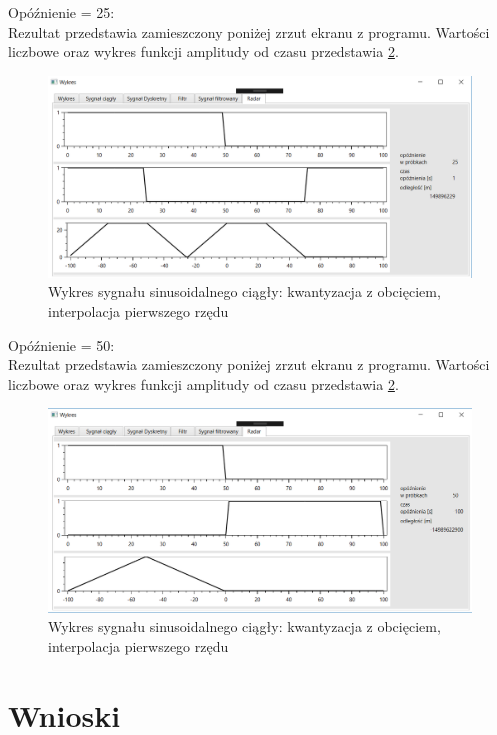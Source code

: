 \documentclass[12pt]{article}
\begin{document}
Opóźnienie = 25:
\\Rezultat przedstawia zamieszczony poniżej zrzut ekranu z programu. Wartości liczbowe oraz wykres funkcji amplitudy od czasu przedstawia \ref{Wykres dla wynikw eksperymentu pierwszego}.
\begin{figure}[h!]
 \centering
 \includegraphics[width=12.3cm]{prostR25.PNG}
 \vspace{-0.3cm}
 \caption{Wykres sygnału sinusoidalnego ciągły: kwantyzacja z obcięciem, interpolacja pierwszego rzędu}
 \label{Wykres dla wynikw eksperymentu pierwszego}
\end{figure}

Opóźnienie = 50:
\\Rezultat przedstawia zamieszczony poniżej zrzut ekranu z programu. Wartości liczbowe oraz wykres funkcji amplitudy od czasu przedstawia \ref{Wykres dla wynikw eksperymentu pierwszego}.
\begin{figure}[h!]
 \centering
 \includegraphics[width=12.3cm]{prostR50.PNG}
 \vspace{-0.3cm}
 \caption{Wykres sygnału sinusoidalnego ciągły: kwantyzacja z obcięciem, interpolacja pierwszego rzędu}
 \label{Wykres dla wynikw eksperymentu pierwszego}
\end{figure}
\section{Wnioski}
\end{document}
